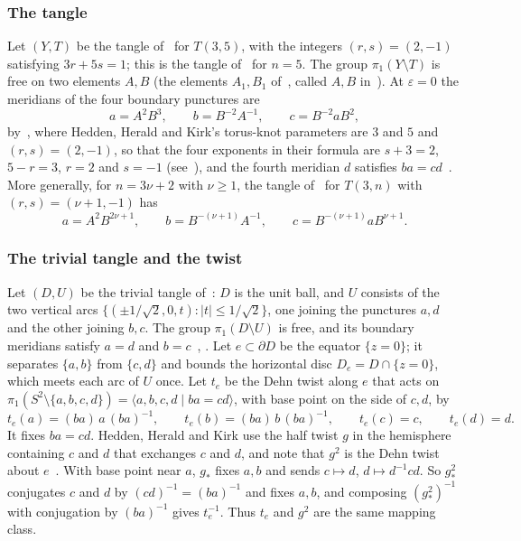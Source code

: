 \subsubsection*{The tangle}
Let $(Y,T)$ be the tangle of~\cite[\S10]{HHK2} for $T(3,5)$, with the integers $(r,s)=(2,-1)$ satisfying $3r+5s=1$;
this is the tangle of~\cite[\S3]{WuebbenV} for $n=5$. The group $\pi_1(Y\setminus T)$ is free on two elements $A,B$
(the elements $A_1,B_1$ of~\cite[\S10]{HHK2}, called $A,B$ in~\cite[\S11]{HHK1}). At $\varepsilon=0$ the meridians of the four boundary punctures are
\begin{equation}\label{eq:words-P}
a=A^2B^3,\qquad b=B^{-2}A^{-1},\qquad c=B^{-2}aB^2,
\end{equation}
by~\cite[(42)]{HHK1}, where Hedden, Herald and Kirk's torus-knot parameters are $3$ and $5$ and $(r,s)=(2,-1)$, so that the four exponents in their formula are $s+3=2$, $5-r=3$, $r=2$ and $s=-1$ (see~\cite[(3.2)]{WuebbenV}), and the fourth meridian $d$
satisfies $ba=cd$~\cite[\S3.3]{HHK1}. More generally, for $n=3\nu+2$ with $\nu\ge1$, the tangle
of~\cite[\S10]{HHK2} for $T(3,n)$ with $(r,s)=(\nu+1,-1)$ has
\begin{equation}\label{eq:words-n}
a=A^2B^{2\nu+1},\qquad b=B^{-(\nu+1)}A^{-1},\qquad c=B^{-(\nu+1)}aB^{\nu+1}.
\end{equation}

\subsubsection*{The trivial tangle and the twist}
Let $(D,U)$ be the trivial tangle of~\cite[(17)]{HHK2}: $D$ is the unit ball, and $U$ consists of the two vertical
arcs $\{(\pm1/\sqrt2,0,t):|t|\le1/\sqrt2\}$, one joining the punctures $a,d$ and the other joining $b,c$. The
group $\pi_1(D\setminus U)$ is free, and its boundary meridians satisfy $a=d$ and $b=c$~\cite[Prop.~6.1]{HHK1},
\cite[p.~4]{FKP}. Let $e\subset\partial D$ be the equator $\{z=0\}$; it separates $\{a,b\}$ from $\{c,d\}$ and bounds
the horizontal disc $D_e=D\cap\{z=0\}$, which meets each arc of $U$ once. Let $t_e$ be the Dehn twist along $e$ that
acts on $\pi_1(S^2\setminus\{a,b,c,d\})=\langle a,b,c,d\mid ba=cd\rangle$, with base point on the side of $c,d$, by
\begin{equation}\label{eq:te}
t_e(a)=(ba)\,a\,(ba)^{-1},\qquad t_e(b)=(ba)\,b\,(ba)^{-1},\qquad t_e(c)=c,\qquad t_e(d)=d .
\end{equation}
It fixes $ba=cd$. Hedden, Herald and Kirk use the half twist $g$ in the hemisphere containing $c$ and $d$ that
exchanges $c$ and $d$, and note that $g^2$ is the Dehn twist about $e$~\cite[proof of Thm.~9.2, p.~49]{HHK2}. With
base point near $a$, $g_*$ fixes $a,b$ and sends $c\mapsto d$, $d\mapsto d^{-1}cd$. So $g^2_*$ conjugates $c$ and $d$ by
$(cd)^{-1}=(ba)^{-1}$ and fixes $a,b$, and composing $(g_*^2)^{-1}$ with conjugation by $(ba)^{-1}$ gives $t_e^{-1}$.
Thus $t_e$ and $g^2$ are the same mapping class.

